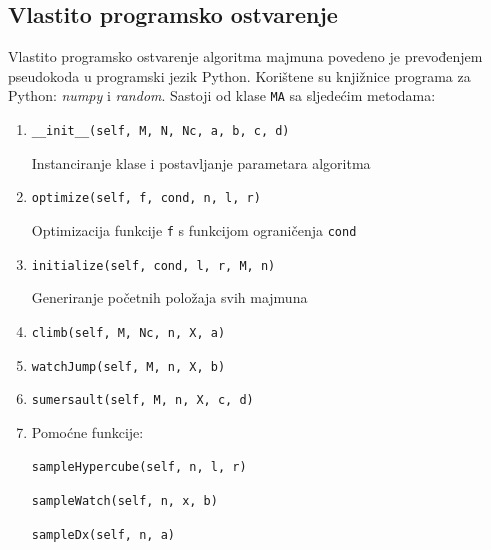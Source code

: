 \subsection{Vlastito programsko ostvarenje}
Vlastito programsko ostvarenje algoritma majmuna povedeno je prevođenjem pseudokoda u programski jezik Python. Korištene su knjižnice programa za Python: \textit{numpy} i \textit{random}. Sastoji od klase \verb|MA| sa sljedećim metodama:

\begin{enumerate}
	\item \verb|__init__(self, M, N, Nc, a, b, c, d)|
	
	Instanciranje klase i postavljanje parametara algoritma
	
	
	\item \verb|optimize(self, f, cond, n, l, r)| 
	
	Optimizacija funkcije \verb|f| s funkcijom ograničenja \verb|cond|
	
	\item \verb|initialize(self, cond, l, r, M, n)| 
	
	Generiranje početnih položaja svih majmuna
	
	\item \verb|climb(self, M, Nc, n, X, a)| 
	
	
	\item \verb|watchJump(self, M, n, X, b)| 
	
	
	\item \verb|sumersault(self, M, n, X, c, d)| 
	
	
	\item Pomoćne funkcije:
	
	\subitem \verb|sampleHypercube(self, n, l, r)| 
	
	
	\subitem \verb|sampleWatch(self, n, x, b)| 
	
	\subitem \verb|sampleDx(self, n, a)| 
	
\end{enumerate}

